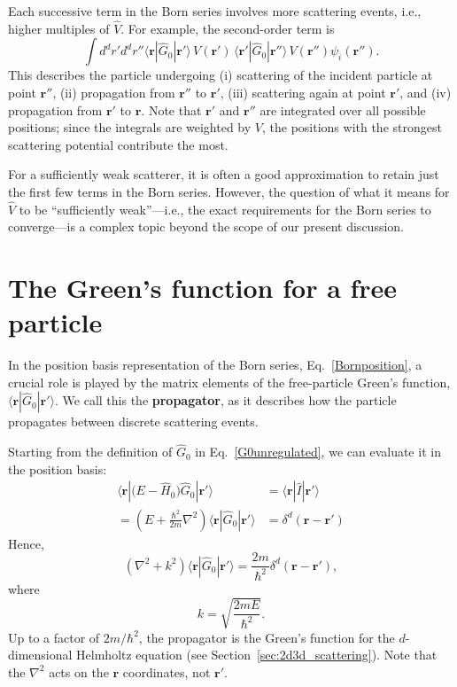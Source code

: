 \documentclass[pra,12pt]{revtex4}
\begin{document}
\noindent
Each successive term in the Born series involves more scattering
events, i.e., higher multiples of $\hat{V}$.  For example, the
second-order term is
\begin{equation*}
  \int d^dr' d^dr'' \langle \mathbf{r} | \hat{G}_0 |\mathbf{r}'\rangle\, V(\mathbf{r}') \, \langle \mathbf{r}' | \hat{G}_0 |\mathbf{r}''\rangle \, V(\mathbf{r}'') \psi_i(\mathbf{r}'').
\end{equation*}
This describes the particle undergoing (i) scattering of the incident
particle at point $\mathbf{r}''$, (ii) propagation from $\mathbf{r}''$
to $\mathbf{r}'$, (iii) scattering again at point $\mathbf{r}'$, and
(iv) propagation from $\mathbf{r}'$ to $\mathbf{r}$.  Note that
$\mathbf{r}'$ and $\mathbf{r}''$ are integrated over all possible
positions; since the integrals are weighted by $V$, the positions with
the strongest scattering potential contribute the most.

For a sufficiently weak scatterer, it is often a good approximation to
retain just the first few terms in the Born series.  However, the
question of what it means for $\hat{V}$ to be ``sufficiently
weak''---i.e., the exact requirements for the Born series to
converge---is a complex topic beyond the scope of our present
discussion.

\section{The Green's function for a free particle}
\label{sec:freegreen}

In the position basis representation of the Born series,
Eq.~\eqref{Bornposition}, a crucial role is played by the matrix
elements of the free-particle Green's function,
$\langle\mathbf{r}|\hat{G}_0|\mathbf{r}'\rangle$.  We call this the
\textbf{propagator}, as it describes how the particle propagates
between discrete scattering events.

Starting from the definition of $\hat{G}_0$ in
Eq.~\eqref{G0unregulated}, we can evaluate it in the position basis:
\begin{align*}
  \langle\mathbf{r} |\big(E-\hat{H}_0\big) \hat{G}_0 |\mathbf{r}'\rangle &= \langle\mathbf{r}|\hat{I}|\mathbf{r}'\rangle \\
  = \left(E + \frac{\hbar^2}{2m}\nabla^2 \right) \langle\mathbf{r} |\hat{G}_0 |\mathbf{r}'\rangle &= \delta^d(\mathbf{r}-\mathbf{r}')
\end{align*}
Hence,
\begin{equation}
  \left(\nabla^2 + k^2\right) \langle\mathbf{r} |\hat{G}_0 |\mathbf{r}'\rangle = \frac{2m}{\hbar^2} \delta^d(\mathbf{r}-\mathbf{r}'),
  \label{propagatoreq}
\end{equation}
where
\begin{equation}
  k = \sqrt{\frac{2mE}{\hbar^2}}.
  \label{kdef}
\end{equation}
Up to a factor of $2m/\hbar^2$, the propagator is the Green's function
for the $d$-dimensional Helmholtz equation (see
Section~\ref{sec:2d3d_scattering}).  Note that the $\nabla^2$ acts on
the $\mathbf{r}$ coordinates, not $\mathbf{r}'$.
\end{document}
